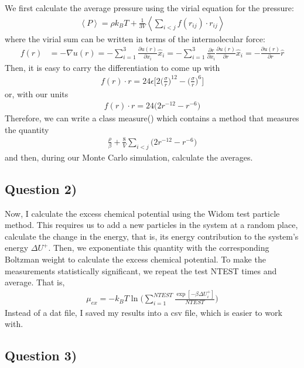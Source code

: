 \documentclass[11pt]{report}
\begin{document}
We first calculate the average pressure using the virial equation for the pressure:
\begin{align}
	\left<P\right>=\rho k_BT+\frac1{3V}\left<\sum_{i<j}f(r_{ij})\cdot r_{ij}\right>
\end{align}
where the virial sum can be written in terms of the intermolecular force:
\begin{align}
	f(r)&=-\nabla u(r)=-\sum_{i=1}^3\frac{\partial u(r)}{\partial x_i}\hat x_i=-\sum_{i=1}^3\frac{\partial r}{\partial x_i}\frac{\partial u(r)}{\partial r}\hat x_i=-\frac{\partial u(r)}{\partial r}\hat r
\end{align}
Then, it is easy to carry the differentiation to come up with
\begin{align}
	f(r)\cdot r=24\epsilon\bigg[2\bigg(\frac{\sigma}{r}\bigg)^{12}-\bigg(\frac{\sigma}{r}\bigg)^6\bigg]
\end{align}
or, with our units
\begin{align}
	f(r)\cdot r = 24\bigg(2r^{-12}-r^{-6}\bigg)
\end{align}
Therefore, we can write a class measure() which contains a method that measures the quantity
\begin{align}
	\frac{\rho}{\beta}+\frac{8}{V}\sum_{i<j}\bigg(2 r^{-12}-r^{-6}\bigg)
\end{align}
and then, during our Monte Carlo simulation, calculate the averages.


\subsection*{Question 2)}

Now, I calculate the excess chemical potential using the Widom test particle method. This requires us to add a new particles in the system at a random place, calculate the change in the energy, that is, its energy contribution to the system's energy $\Delta U^+$. Then, we exponentiate this quantity with the corresponding Boltzman weight to calculate the excess chemical potential. To make the measurements statistically significant, we repeat the test NTEST times and average. That is,
\begin{align}
	\mu_{ex}=-k_BT\ln\bigg(\sum_{i=1}^{NTEST}\frac{\exp[-\beta\Delta U_i^+]}{NTEST}\bigg)
\end{align}
Instead of a dat file, I saved my results into a csv file, which is easier to work with.


\subsection*{Question 3)}
\end{document}
